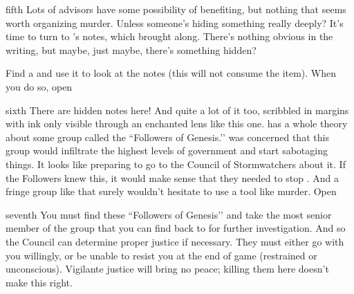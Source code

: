 \documentclass[notebook]{GL2020} %
\begin{document}
\begin{page}{fifth}
Lots of advisors have some possibility of benefiting, but nothing that seems worth organizing murder. Unless someone’s hiding something really deeply? It’s time to turn to \cHeadDiplomat{}’s notes, which \cJuniorStatesman{} brought along. There’s nothing obvious in the writing, but maybe, just maybe, there’s something hidden?

Find a \iCrystalLens{} and use it to look at the notes (this will not consume the item). When you do so, open 
\end{page}

\begin{page}{sixth}
There are hidden notes here! And quite a lot of it too, scribbled in margins with ink only visible through an enchanted lens like this one. \cHeadDiplomat{} has a whole theory about some group called the ``Followers of Genesis.’’ \cHeadDiplomat{} was concerned that this group would infiltrate the highest levels of government and start sabotaging things. It looks like \cHeadDiplomat{\they} \cHeadDiplomat{\were} preparing to go to the Council of Stormwatchers about it. If the Followers knew this, it would make sense that they needed to stop \cHeadDiplomat{}. And a fringe group like that surely wouldn’t hesitate to use a tool like murder. Open 
\end{page}

\begin{page}{seventh}
You must find these ``Followers of Genesis’’ and take the most senior member of the group that you can find back to \pShip{} for further investigation. And so the Council can determine proper justice if necessary. They must either go with you willingly, or be unable to resist you at the end of game (restrained or unconscious). Vigilante justice will bring no peace; killing them here doesn’t make this right.
\end{page}

\endnotebook
\end{document}

